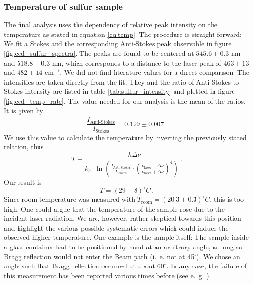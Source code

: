 \subsubsection{Temperature of sulfur sample}
The final analysis uses the dependency of relative peak intensity on the temperature as stated
in equation \eqref{eq:temp}. The procedure is straight forward: We fit a Stokes and the 
corresponding Anti-Stokes peak observable in figure \ref{fig:ccd_sulfur_spectra}. 
The peaks are found to be centered at $545.6 \pm 0.3$ nm 
and $518.8 \pm 0.3$ nm, which corresponds to a distance to the laser peak of $463 \pm 13$ and 
$482 \pm 14$ cm$^{-1}$. We did not find literature values for a direct comparison. 
The intensities are taken directly from the fit. They and the ratio of Anti-Stokes to Stokes
intensity are listed in table \ref{tab:sulfur_intensity} and plotted in figure 
\ref{fig:ccd_temp_rate}. The value needed for our analysis 
is the mean of the ratios. It is given by 
\begin{equation*}
    \overline{\frac{I_\text{Anti-Stokes}}{I_\text{Stokes}}} = 0.129 \pm 0.007 \, .
\end{equation*}
We use this value to calculate the temperature by inverting the previously stated relation, 
thus 
\begin{equation}
    T = \frac{-h \Delta \nu}{
        k_b \cdot \ln \left(
            \frac{I_\text{Anti-Stokes}}{I_\text{Stokes}} \cdot \left(\frac{\nu_\text{laser} - 
            \Delta \nu}{\nu_\text{laser} + \Delta \nu}\right)^4 
    \right)} \, .
\end{equation}
Our result is 
\begin{equation}
    T = (29 \pm 8) ^\circ C \, .
\end{equation}
Since room temperature was measured with $T_\text{room} = (20.3 \pm 0.3) ^\circ C$, this is too high. 
One could argue that the temperature of the sample rose due to the incident laser radiation. 
We are, however, rather skeptical towards this position and highlight the various possible 
systematic errors which could induce the observed higher temperature. 
One example is the sample itself: The sample inside a glass container had to be positioned 
by hand at an arbitrary angle, as long as Bragg reflection would not enter the Beam path 
(i.~e. not at 45$^\circ$). We chose an angle such that Bragg reflection occurred at about 
$60^\circ$. In any case, the failure of this 
measurement has been reported various times before (see e.~g. \cite{wiss}). 

